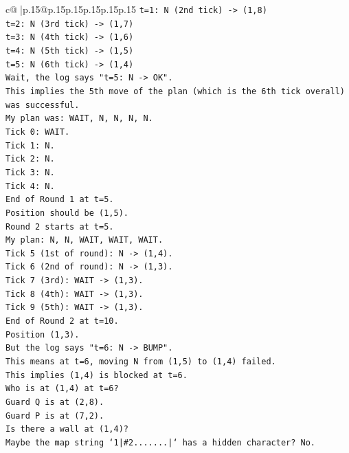 \documentclass{article}
\begin{document}
{\begin{supertabular}{c@{$\;$}|p{.15\linewidth}@{}p{.15\linewidth}p{.15\linewidth}p{.15\linewidth}p{.15\linewidth}p{.15\linewidth}}
{{{\texttt{t=1: N (2nd tick) {-}> (1,8)} \\
\texttt{t=2: N (3rd tick) {-}> (1,7)} \\
\texttt{t=3: N (4th tick) {-}> (1,6)} \\
\texttt{t=4: N (5th tick) {-}> (1,5)} \\
\texttt{t=5: N (6th tick) {-}> (1,4)} \\
\texttt{Wait, the log says "t=5: N {-}> OK".} \\
\texttt{This implies the 5th move of the plan (which is the 6th tick overall) was successful.} \\
\texttt{My plan was: WAIT, N, N, N, N.} \\
\texttt{Tick 0: WAIT.} \\
\texttt{Tick 1: N.} \\
\texttt{Tick 2: N.} \\
\texttt{Tick 3: N.} \\
\texttt{Tick 4: N.} \\
\texttt{End of Round 1 at t=5.} \\
\texttt{Position should be (1,5).} \\
\texttt{Round 2 starts at t=5.} \\
\texttt{My plan: N, N, WAIT, WAIT, WAIT.} \\
\texttt{Tick 5 (1st of round): N {-}> (1,4).} \\
\texttt{Tick 6 (2nd of round): N {-}> (1,3).} \\
\texttt{Tick 7 (3rd): WAIT {-}> (1,3).} \\
\texttt{Tick 8 (4th): WAIT {-}> (1,3).} \\
\texttt{Tick 9 (5th): WAIT {-}> (1,3).} \\
\texttt{End of Round 2 at t=10.} \\
\texttt{Position (1,3).} \\
\texttt{But the log says "t=6: N {-}> BUMP".} \\
\texttt{This means at t=6, moving N from (1,5) to (1,4) failed.} \\
\texttt{This implies (1,4) is blocked at t=6.} \\
\texttt{Who is at (1,4) at t=6?} \\
\texttt{Guard Q is at (2,8).} \\
\texttt{Guard P is at (7,2).} \\
\texttt{Is there a wall at (1,4)?} \\
\texttt{Maybe the map string `1|\#2.......|` has a hidden character? No.} \\
}}}
\end{supertabular}}
\end{document}
